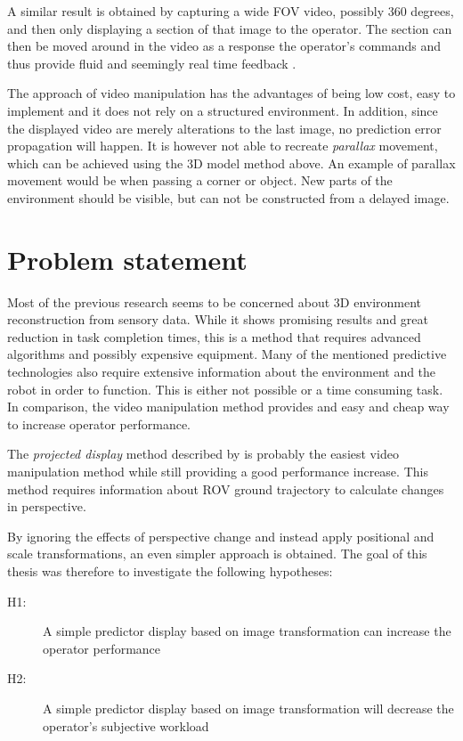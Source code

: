 A similar result is obtained by capturing a wide FOV video, possibly 360 degrees, and then only displaying a section of that image to the operator. The section can then be moved around in the video as a response the operator's commands and thus provide fluid and seemingly real time feedback \citep{Baldwin1999}.

The approach of video manipulation has the advantages of being low cost, easy to implement and it does not rely on a structured environment. In addition, since the displayed video are merely alterations to the last image, no prediction error propagation will happen. It is however not able to recreate \textit{parallax} movement, which can be achieved using the 3D model method above. An example of parallax movement would be when passing a corner or object. New parts of the environment should be visible, but can not be constructed from a delayed image.

\section{Problem statement}

Most of the previous research seems to be concerned about 3D environment reconstruction from sensory data. While it shows promising results and great reduction in task completion times, this is a method that requires advanced algorithms and possibly expensive equipment. Many of the mentioned predictive technologies also require extensive information about the environment and the robot in order to function. This is either not possible or a time consuming task. In comparison, the video manipulation method provides and easy and cheap way to increase operator performance.

The \textit{projected display} method described by \citet{Matheson2013} is probably the easiest video manipulation method while still providing a good performance increase. This method requires information about ROV ground trajectory to calculate changes in perspective. 

By ignoring the effects of perspective change and instead apply positional and scale transformations, an even simpler approach is obtained. The goal of this thesis was therefore to investigate the following hypotheses:

\begin{description}
\item[H1:] A simple predictor display based on image transformation can increase the operator performance
 
 \item[H2:] A simple predictor display based on image transformation will decrease the operator's subjective workload
\end{description}

